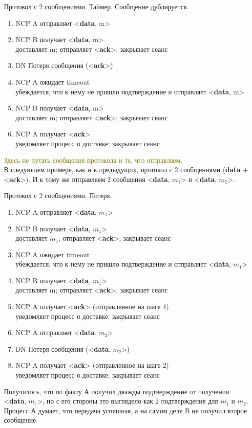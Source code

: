 \begin{algorithm}
	\caption{Протокол с 2 сообщениями. Таймер. Сообщение дублируется.}
	\begin{enumerate}
		\item NCP A отправляет <\textbf{data}, m>
		\item NCP B получает <\textbf{data}, m> \\
			доставляет m; отправляет <\textbf{ack}>; закрывает сеанс
		\item DN Потеря сообщения (<\textbf{ack}>)
		\item NCP A ожидает timeout \\
			убеждается, что к нему не пришло подтверждение и отправляет <\textbf{data}, m>
		\item NCP B получает <\textbf{data}, m> \\
			доставляет m; отправляет <\textbf{ack}>; закрывает сеанс
		\item NCP A получает <\textbf{ack}> \\
			уведомляет процесс о доставке; закрывает сеанс
	\end{enumerate}
\end{algorithm}

\textcolor{olive}{Здесь не путать сообщения протокола и те, что отправляем.}\\
В следующем примере, как и в предыдущих, протокол с 2 сообщениями (\textbf{data} + <\textbf{ack}>). И к тому же отправляем 2 сообщения <\textbf{data}, $m_1$> и <\textbf{data}, $m_2$>.

\begin{algorithm}
	\caption{Протокол с 2 сообщениями. Потеря.}
	\begin{enumerate}
		\item NCP A отправляет <\textbf{data}, $m_1$>
		\item NCP B получает <\textbf{data}, $m_1$> \\
			доставляет $m_1$; отправляет <\textbf{ack}>; закрывает сеанс
		\item NCP A ожидает timeout \\
			убеждается, что к нему не пришло подтверждение и отправляет <\textbf{data},  $m_1$>
		\item NCP B получает <\textbf{data},  $m_1$> \\
			доставляет m; отправляет <\textbf{ack}>; закрывает сеанс
		\item NCP A получает <\textbf{ack}> (отправленное на шаге 4) \\
			уведомляет процесс о доставке; закрывает сеанс
		\item NCP A отправляет <\textbf{data}, $m_2$>
		\item DN Потеря сообщения (<\textbf{data}, $m_2$>)
		\item NCP A получает <\textbf{ack}> (отправленное на шаге 2) \\
			уведомляет процесс о доставке; закрывает сеанс
	\end{enumerate}
\end{algorithm}
Получилось, что по факту А получил дважды подтверждение от получении <\textbf{data}, $m_1$>, но с его стороны это выглядело как 2 подтверждения для $m_1$ и $m_2$. Процесс А думает, что передача успешная, а на самом деле B не получил второе сообщение.


